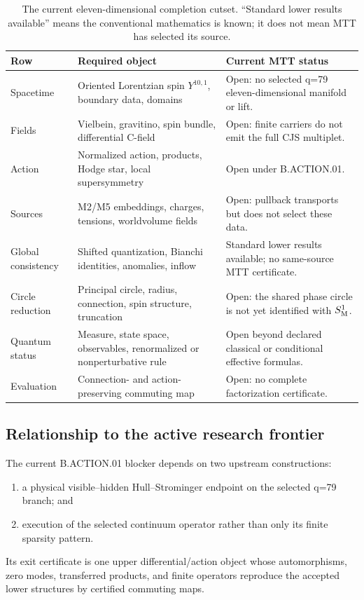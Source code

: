 \documentclass[11pt]{article}
\theoremstyle{definition}
\theoremstyle{remark}
\begin{document}
\begin{table}[htbp]
\centering
\small
\begin{tabularx}{\textwidth}{@{}p{}p{}X@{}}
\toprule
Row & Required object & Current MTT status \\
\midrule
Spacetime
& Oriented Lorentzian spin \(Y^{10,1}\), boundary data, domains
& Open: no selected q=79 eleven-dimensional manifold or lift. \\
Fields
& Vielbein, gravitino, spin bundle, differential C-field
& Open: finite carriers do not emit the full CJS multiplet. \\
Action
& Normalized action, products, Hodge star, local supersymmetry
& Open under B.ACTION.01. \\
Sources
& M2/M5 embeddings, charges, tensions, worldvolume fields
& Open: pullback transports but does not select these data. \\
Global consistency
& Shifted quantization, Bianchi identities, anomalies, inflow
& Standard lower results available; no same-source MTT certificate. \\
Circle reduction
& Principal circle, radius, connection, spin structure, truncation
& Open: the shared phase circle is not yet identified with \(S^1_{\rm M}\). \\
Quantum status
& Measure, state space, observables, renormalized or nonperturbative rule
& Open beyond declared classical or conditional effective formulas. \\
Evaluation
& Connection- and action-preserving commuting map
& Open: no complete factorization certificate. \\
\bottomrule
\end{tabularx}
\caption{The current eleven-dimensional completion cutset.  ``Standard
lower results available'' means the conventional mathematics is known; it
does not mean MTT has selected its source.}
\label{tab:status}
\end{table}

\subsection{Relationship to the active research frontier}

The current B.ACTION.01 blocker depends on two upstream constructions:
\begin{enumerate}[leftmargin=1.7em]
\item a physical visible--hidden Hull--Strominger endpoint on the selected
      q=79 branch; and
\item execution of the selected continuum operator rather than only its
      finite sparsity pattern.
\end{enumerate}
Its exit certificate is one upper differential/action object whose
automorphisms, zero modes, transferred products, and finite operators
reproduce the accepted lower structures by certified commuting maps.
\end{document}
